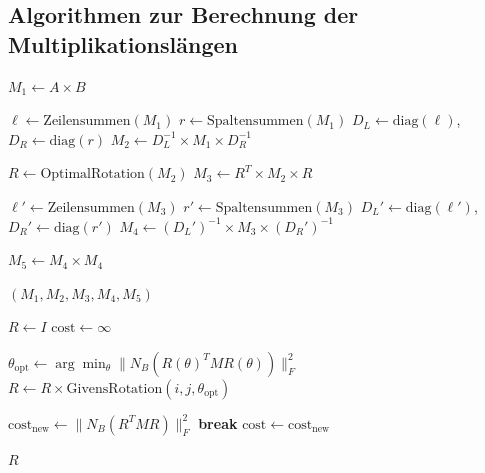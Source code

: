\documentclass[a4paper,12pt]{article}
\theoremstyle{definition}
\begin{document}
\subsection{Algorithmen zur Berechnung der Multiplikationslängen}

\begin{algorithm}[h]
\caption{Berechnung der fünf Multiplikationslängen}
\label{alg:mlm_compute}
\begin{algorithmic}[1]
	\State $M_1 \leftarrow A \times B$ 
	
	\State $\ell \leftarrow \text{Zeilensummen}(M_1)$ 
	\State $r \leftarrow \text{Spaltensummen}(M_1)$ 
	\State $D_L \leftarrow \text{diag}(\ell)$, $D_R \leftarrow \text{diag}(r)$
	\State $M_2 \leftarrow D_L^{-1} \times M_1 \times D_R^{-1}$
	
	\State $R \leftarrow \text{OptimalRotation}(M_2)$ 
	\State $M_3 \leftarrow R^T \times M_2 \times R$
	
	\State $\ell' \leftarrow \text{Zeilensummen}(M_3)$
	\State $r' \leftarrow \text{Spaltensummen}(M_3)$
	\State $D_L' \leftarrow \text{diag}(\ell')$, $D_R' \leftarrow \text{diag}(r')$
	\State $M_4 \leftarrow (D_L')^{-1} \times M_3 \times (D_R')^{-1}$
	
	\State $M_5 \leftarrow M_4 \times M_4$
	
	\State \Return $(M_1, M_2, M_3, M_4, M_5)$
\EndProcedure
\end{algorithmic}
\end{algorithm}

\begin{algorithm}[h]
\caption{Optimale Rotation zur Blockstruktur-Minimierung}
\label{alg:rotation}
\begin{algorithmic}[1]
	\State $R \leftarrow I$ 
	\State $\text{cost} \leftarrow \infty$
	
				\State $\theta_{\text{opt}} \leftarrow \arg\min_\theta \|N_B(R(\theta)^T M R(\theta))\|_F^2$
				\State $R \leftarrow R \times \text{GivensRotation}(i, j, \theta_{\text{opt}})$
			\EndFor
		\EndFor
		
		\State $\text{cost}_{\text{new}} \leftarrow \|N_B(R^T M R)\|_F^2$
			\State \textbf{break}
		\EndIf
		\State $\text{cost} \leftarrow \text{cost}_{\text{new}}$
	\EndFor
	
	\State \Return $R$
\EndProcedure
\end{algorithmic}
\end{algorithm}
\end{document}
